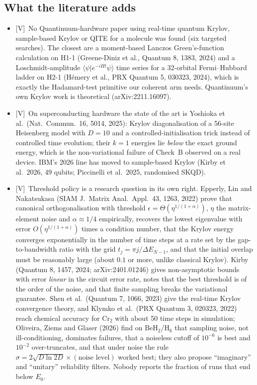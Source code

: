 \documentclass[11pt,a4paper]{article}
\newcommand{\braket}[2]{\langle #1\vert #2\rangle}
\newcommand{\lV}{\textcolor{keyblue}{[V]}}   %
\begin{document}
\subsection{What the literature adds}
\begin{itemize}
\item \lV\ No Quantinuum-hardware paper using real-time quantum Krylov, sample-based Krylov or QITE for a molecule was found (six targeted searches). The closest are a moment-based Lanczos Green's-function calculation on H1-1 (Greene-Diniz et al., Quantum 8, 1383, 2024) and a Loschmidt-amplitude $\braket{\psi}{e^{-iHt}\psi}$ time series for a 32-orbital Fermi--Hubbard ladder on H2-1 (H\'emery et al., PRX Quantum 5, 030323, 2024), which is exactly the Hadamard-test primitive our coherent arm needs. Quantinuum's own Krylov work is theoretical (arXiv:2211.16097).
\item \lV\ On superconducting hardware the state of the art is Yoshioka et al.\ (Nat.\ Commun.\ 16, 5014, 2025): Krylov diagonalisation of a 56-site Heisenberg model with $D=10$ and a controlled-initialisation trick instead of controlled time evolution; their $k=1$ energies lie \emph{below} the exact ground energy, which is the non-variational failure of Check~B observed on a real device. IBM's 2026 line has moved to sample-based Krylov (Kirby et al.\ 2026, 49 qubits; Piccinelli et al.\ 2025, randomised SKQD).
\item \lV\ Threshold policy is a research question in its own right. Epperly, Lin and Nakatsukasa (SIAM J.\ Matrix Anal.\ Appl.\ 43, 1263, 2022) prove that canonical orthogonalisation with threshold $\epsilon=\Theta(\eta^{1/(1+\alpha)})$, $\eta$ the matrix-element noise and $\alpha\approx1/4$ empirically, recovers the lowest eigenvalue with error $O(\eta^{1/(1+\alpha)})$ times a condition number, that the Krylov energy converges exponentially in the number of time steps at a rate set by the gap-to-bandwidth ratio with the grid $t_j=\pi j/\Delta E_{N-1}$, and that the initial overlap must be reasonably large (about $0.1$ or more, unlike classical Krylov). Kirby (Quantum 8, 1457, 2024; arXiv:2401.01246) gives non-asymptotic bounds with error \emph{linear} in the circuit error rate, notes that the best threshold is of the order of the noise, and that finite sampling breaks the variational guarantee. Shen et al.\ (Quantum 7, 1066, 2023) give the real-time Krylov convergence theory, and Klymko et al.\ (PRX Quantum 3, 020323, 2022) reach chemical accuracy for Cr$_2$ with about 50 time steps in simulation; Oliveira, Ziems and Glaser (2026) find on BeH$_2$/H$_6$ that sampling noise, not ill-conditioning, dominates failures, that a noiseless cutoff of $10^{-6}$ is best and $10^{-2}$ over-truncates, and that under noise the rule $\sigma = 2\sqrt{D\ln 2D}\times(\text{noise level})$ worked best; they also propose ``imaginary'' and ``unitary'' reliability filters. Nobody reports the fraction of runs that end below $E_0$.

\end{itemize}
\end{document}
